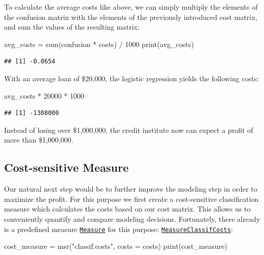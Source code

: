 \documentclass[
]{scrbook}
\newenvironment{Shaded}{\begin{snugshade}}{\end{snugshade}}
\newcommand{\AttributeTok}[1]{\textcolor[rgb]{0.77,0.63,0.00}{#1}}
\newcommand{\DecValTok}[1]{\textcolor[rgb]{0.00,0.00,0.81}{#1}}
\newcommand{\FunctionTok}[1]{\textcolor[rgb]{0.00,0.00,0.00}{#1}}
\newcommand{\NormalTok}[1]{#1}
\newcommand{\OtherTok}[1]{\textcolor[rgb]{0.56,0.35,0.01}{#1}}
\newcommand{\SpecialCharTok}[1]{\textcolor[rgb]{0.00,0.00,0.00}{#1}}
\newcommand{\StringTok}[1]{\textcolor[rgb]{0.31,0.60,0.02}{#1}}
\renewenvironment{Shaded} {\begin{snugshade}\small} {\end{snugshade}}
\begin{document}
To calculate the average costs like above, we can simply multiply the elements of the confusion matrix with the elements of the previously introduced cost matrix, and sum the values of the resulting matrix:

\begin{Shaded}
\begin{Highlighting}[]
\NormalTok{avg\_costs }\OtherTok{=} \FunctionTok{sum}\NormalTok{(confusion }\SpecialCharTok{*}\NormalTok{ costs) }\SpecialCharTok{/} \DecValTok{1000}
\FunctionTok{print}\NormalTok{(avg\_costs)}
\end{Highlighting}
\end{Shaded}

\begin{verbatim}
## [1] -0.0654
\end{verbatim}

With an average loan of \$20,000, the logistic regression yields the following costs:

\begin{Shaded}
\begin{Highlighting}[]
\NormalTok{avg\_costs }\SpecialCharTok{*} \DecValTok{20000} \SpecialCharTok{*} \DecValTok{1000}
\end{Highlighting}
\end{Shaded}

\begin{verbatim}
## [1] -1308000
\end{verbatim}

Instead of losing over \$1,000,000, the credit institute now can expect a profit of more than \$1,000,000.

\hypertarget{cost-sensitive-measure}{%
\subsection{Cost-sensitive Measure}\label{cost-sensitive-measure}}

Our natural next step would be to further improve the modeling step in order to maximize the profit.
For this purpose we first create a cost-sensitive classification measure which calculates the costs based on our cost matrix.
This allows us to conveniently quantify and compare modeling decisions.
Fortunately, there already is a predefined measure \href{https://mlr3.mlr-org.com/reference/Measure.html}{\texttt{Measure}} for this purpose: \href{https://mlr3.mlr-org.com/reference/mlr_measures_classif.costs.html}{\texttt{MeasureClassifCosts}}:

\begin{Shaded}
\begin{Highlighting}[]
\NormalTok{cost\_measure }\OtherTok{=} \FunctionTok{msr}\NormalTok{(}\StringTok{"classif.costs"}\NormalTok{, }\AttributeTok{costs =}\NormalTok{ costs)}
\FunctionTok{print}\NormalTok{(cost\_measure)}
\end{Highlighting}
\end{Shaded}
\end{document}
